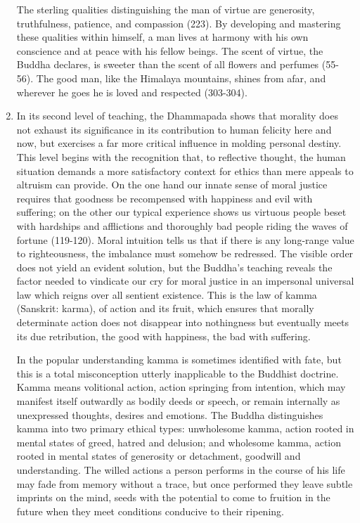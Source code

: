 \begin{enumerate}[i]
The sterling qualities distinguishing the man of virtue are generosity, truthfulness, patience, and compassion (223). By developing and mastering these qualities within himself, a man lives at harmony with his own conscience and at peace with his fellow beings. The scent of virtue, the Buddha declares, is sweeter than the scent of all flowers and perfumes (55-56). The good man, like the Himalaya mountains, shines from afar, and wherever he goes he is loved and respected (303-304).

\item In its second level of teaching, the Dhammapada shows that morality does not exhaust its significance in its contribution to human felicity here and now, but exercises a far more critical influence in molding personal destiny. This level begins with the recognition that, to reflective thought, the human situation demands a more satisfactory context for ethics than mere appeals to altruism can provide. On the one hand our innate sense of moral justice requires that goodness be recompensed with happiness and evil with suffering; on the other our typical experience shows us virtuous people beset with hardships and afflictions and thoroughly bad people riding the waves of fortune (119-120). Moral intuition tells us that if there is any long-range value to righteousness, the imbalance must somehow be redressed. The visible order does not yield an evident solution, but the Buddha's teaching reveals the factor needed to vindicate our cry for moral justice in an impersonal universal law which reigns over all sentient existence. This is the law of kamma (Sanskrit: karma), of action and its fruit, which ensures that morally determinate action does not disappear into nothingness but eventually meets its due retribution, the good with happiness, the bad with suffering.

In the popular understanding kamma is sometimes identified with fate, but this is a total misconception utterly inapplicable to the Buddhist doctrine. Kamma means volitional action, action springing from intention, which may manifest itself outwardly as bodily deeds or speech, or remain internally as unexpressed thoughts, desires and emotions. The Buddha distinguishes kamma into two primary ethical types: unwholesome kamma, action rooted in mental states of greed, hatred and delusion; and wholesome kamma, action rooted in mental states of generosity or detachment, goodwill and understanding. The willed actions a person performs in the course of his life may fade from memory without a trace, but once performed they leave subtle imprints on the mind, seeds with the potential to come to fruition in the future when they meet conditions conducive to their ripening.


\end{enumerate}
